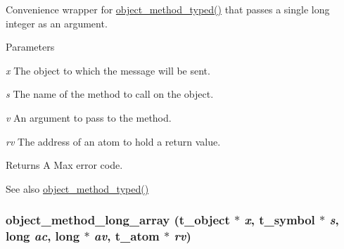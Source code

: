Convenience wrapper for \hyperlink{group__obj_ga443dee482af22e0fe83e68955d367226}{object\_\-method\_\-typed()} that passes a single long integer as an argument. 
\begin{DoxyParams}{Parameters}
\item[{\em x}]The object to which the message will be sent. \item[{\em s}]The name of the method to call on the object. \item[{\em v}]An argument to pass to the method. \item[{\em rv}]The address of an atom to hold a return value.\end{DoxyParams}
\begin{DoxyReturn}{Returns}
A Max error code. 
\end{DoxyReturn}
\begin{DoxySeeAlso}{See also}
\hyperlink{group__obj_ga443dee482af22e0fe83e68955d367226}{object\_\-method\_\-typed()} 
\end{DoxySeeAlso}
\hypertarget{group__obj_ga76c93edf094492b8f485b7a401c616b6}{
\subsubsection[{object\_\-method\_\-long\_\-array}]{ object\_\-method\_\-long\_\-array ({\bf t\_\-object} $\ast$ {\em x}, \/  {\bf t\_\-symbol} $\ast$ {\em s}, \/  long {\em ac}, \/  long $\ast$ {\em av}, \/  {\bf t\_\-atom} $\ast$ {\em rv})}}
\label{group__obj_ga76c93edf094492b8f485b7a401c616b6}


